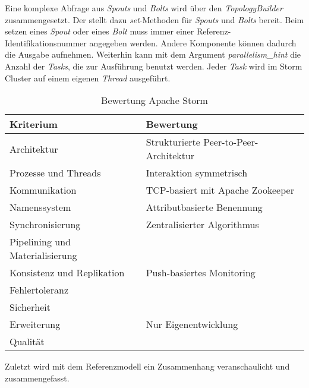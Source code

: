 Eine komplexe Abfrage aus \textit{Spouts} und \textit{Bolts} wird über den \textit{TopologyBuilder} zusammengesetzt. Der stellt dazu \textit{set}-Methoden für \textit{Spouts} und \textit{Bolts} bereit. Beim setzen eines \textit{Spout} oder eines \textit{Bolt} muss immer einer Referenz-Identifikationsnummer angegeben werden. Andere Komponente können dadurch die Ausgabe aufnehmen. Weiterhin kann mit dem Argument \textit{parallelism\_hint} die Anzahl der \textit{Tasks}, die zur Ausführung benutzt werden. Jeder \textit{Task} wird im Storm Cluster auf einem eigenen \textit{Thread} ausgeführt. 

\begin{table}[htbp]
	\centering
		\begin{tabular}{@{}ll@{}} \toprule
			\textbf{Kriterium} & \textbf{Bewertung} \\ \midrule
			Architektur & Strukturierte Peer-to-Peer-Architektur \\
			Prozesse und Threads & Interaktion symmetrisch \\ 
			Kommunikation &  TCP-basiert mit Apache Zookeeper \\
			Namenssystem &  Attributbasierte Benennung\\
			Synchronisierung &  Zentralisierter Algorithmus \\
			Pipelining und Materialisierung &  \\
			Konsistenz und Replikation & Push-basiertes Monitoring \\			
			Fehlertoleranz &   \\
			Sicherheit &  \\
			Erweiterung & Nur Eigenentwicklung \\
			Qualität &  \\
			\bottomrule			
		\end{tabular}
	\caption{Bewertung Apache Storm}
	\label{tab:bewstorm}
\end{table}

Zuletzt wird mit dem Referenzmodell ein Zusammenhang veranschaulicht und zusammengefasst.